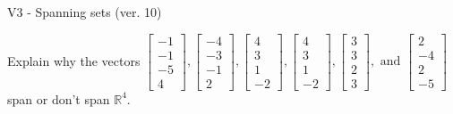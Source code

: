 \begin{exercise}
  \begin{exerciseTitle}V3 - Spanning sets (ver. 10)\end{exerciseTitle}
  \begin{exerciseStatement}
    Explain why the vectors \(\left[\begin{array}{r}
-1 \\
-1 \\
-5 \\
4
\end{array}\right] , \left[\begin{array}{r}
-4 \\
-3 \\
-1 \\
2
\end{array}\right] , \left[\begin{array}{r}
4 \\
3 \\
1 \\
-2
\end{array}\right] , \left[\begin{array}{r}
4 \\
3 \\
1 \\
-2
\end{array}\right] , \left[\begin{array}{r}
3 \\
3 \\
2 \\
3
\end{array}\right] , \text{ and } \left[\begin{array}{r}
2 \\
-4 \\
2 \\
-5
\end{array}\right]\) span or don't span \(\mathbb{R}^4\). 
	



\end{exerciseStatement}
\end{exercise}
